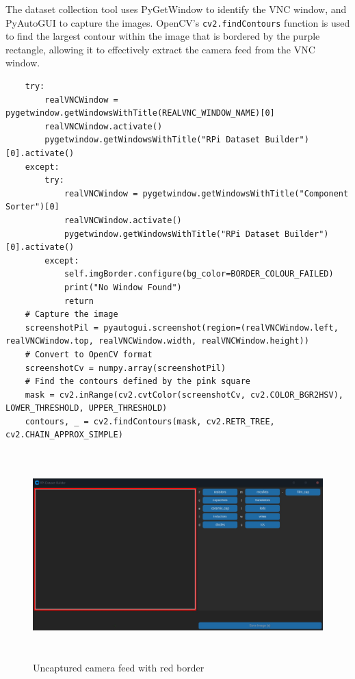 The dataset collection tool uses PyGetWindow \cite{pygetwindow_2020} to identify the VNC window, and PyAutoGUI \cite{pyautogui_2023} to capture the images. OpenCV's \cite{home_2024} \texttt{cv2.findContours} function is used to find the largest contour within the image that is bordered by the purple rectangle, allowing it to effectively extract the camera feed from the VNC window.

\begin{minipage}[H]{\textwidth}
    \centering
    \begin{verbatim}
    try:
        realVNCWindow = pygetwindow.getWindowsWithTitle(REALVNC_WINDOW_NAME)[0]
        realVNCWindow.activate()
        pygetwindow.getWindowsWithTitle("RPi Dataset Builder")[0].activate()
    except:
        try:
            realVNCWindow = pygetwindow.getWindowsWithTitle("Component Sorter")[0]
            realVNCWindow.activate()
            pygetwindow.getWindowsWithTitle("RPi Dataset Builder")[0].activate()
        except:
            self.imgBorder.configure(bg_color=BORDER_COLOUR_FAILED)
            print("No Window Found")
            return
    # Capture the image
    screenshotPil = pyautogui.screenshot(region=(realVNCWindow.left, realVNCWindow.top, realVNCWindow.width, realVNCWindow.height))
    # Convert to OpenCV format
    screenshotCv = numpy.array(screenshotPil)
    # Find the contours defined by the pink square
    mask = cv2.inRange(cv2.cvtColor(screenshotCv, cv2.COLOR_BGR2HSV), LOWER_THRESHOLD, UPPER_THRESHOLD)
    contours, _ = cv2.findContours(mask, cv2.RETR_TREE, cv2.CHAIN_APPROX_SIMPLE)
    \end{verbatim}
\end{minipage}

\begin{figure}[H]
    \hfill
    \begin{minipage}[t]{\textwidth}
      \centering
      \includegraphics[height=8cm]{imgs/python/uncaptured.jpg}
      \caption{Uncaptured camera feed with red border}
        \label{fig:uncaptured}
    \end{minipage}
\end{figure}

